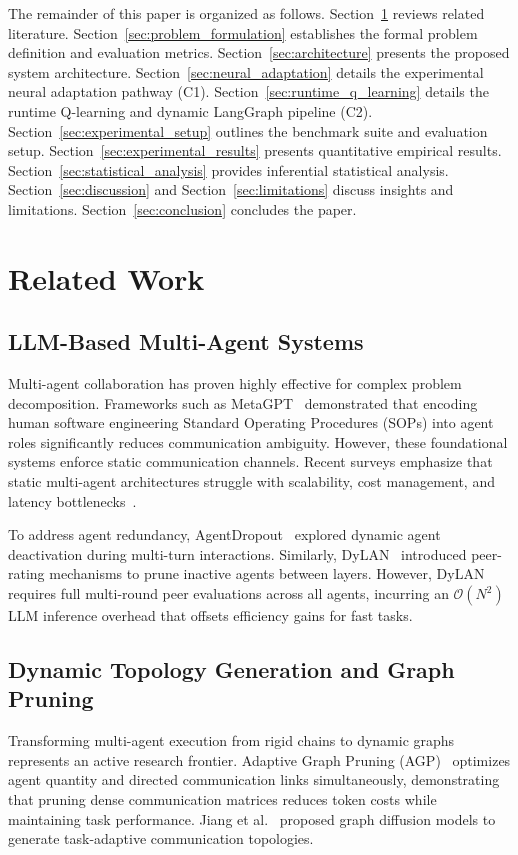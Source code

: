 \documentclass[conference]{IEEEtran}
\begin{document}
The remainder of this paper is organized as follows. Section~\ref{sec:related_work} reviews related literature. Section~\ref{sec:problem_formulation} establishes the formal problem definition and evaluation metrics. Section~\ref{sec:architecture} presents the proposed system architecture. Section~\ref{sec:neural_adaptation} details the experimental neural adaptation pathway (C1). Section~\ref{sec:runtime_q_learning} details the runtime Q-learning and dynamic LangGraph pipeline (C2). Section~\ref{sec:experimental_setup} outlines the benchmark suite and evaluation setup. Section~\ref{sec:experimental_results} presents quantitative empirical results. Section~\ref{sec:statistical_analysis} provides inferential statistical analysis. Section~\ref{sec:discussion} and Section~\ref{sec:limitations} discuss insights and limitations. Section~\ref{sec:conclusion} concludes the paper.

\section{Related Work}
\label{sec:related_work}

\subsection{LLM-Based Multi-Agent Systems}
Multi-agent collaboration has proven highly effective for complex problem decomposition. Frameworks such as MetaGPT~\cite{hong2024metagpt} demonstrated that encoding human software engineering Standard Operating Procedures (SOPs) into agent roles significantly reduces communication ambiguity. However, these foundational systems enforce static communication channels. Recent surveys emphasize that static multi-agent architectures struggle with scalability, cost management, and latency bottlenecks~\cite{lee2026survey,cao2025survey,sun2024llmmarl}.

To address agent redundancy, AgentDropout~\cite{xiao2026agentdropout} explored dynamic agent deactivation during multi-turn interactions. Similarly, DyLAN~\cite{liu2026llm} introduced peer-rating mechanisms to prune inactive agents between layers. However, DyLAN requires full multi-round peer evaluations across all agents, incurring an $\mathcal{O}(N^2)$ LLM inference overhead that offsets efficiency gains for fast tasks.

\subsection{Dynamic Topology Generation and Graph Pruning}
Transforming multi-agent execution from rigid chains to dynamic graphs represents an active research frontier. Adaptive Graph Pruning (AGP)~\cite{Li2025AdaptiveGraphPruning} optimizes agent quantity and directed communication links simultaneously, demonstrating that pruning dense communication matrices reduces token costs while maintaining task performance. Jiang et al.~\cite{Jiang2026GTD} proposed graph diffusion models to generate task-adaptive communication topologies.
\end{document}
